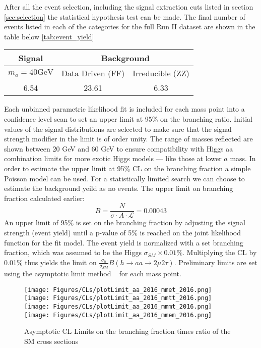 

After all the event selection, including the signal extraction cuts listed in section \ref{sec:selection} the statistical hypothesis test can be made. 
The final number of events listed in each of the categories for the full Run II dataset are shown in the table below \ref{tab:event_yield}


\begin{table}[h!tbp]
\centering
{}
\begin{tabular*}{0.8\textwidth}{c|c|c}
\hline
Signal & \multicolumn{2}{c}{Background} \\
\hline $m_a=40\text{GeV}$ & Data Driven (FF) & Irreducible (ZZ)\\\hline
6.54   & 23.61 & 6.33 \\\hline
\end{tabular*}
\end{table}
 



Each unbinned parametric likelihood fit is included for each mass point into a confidence level scan to set an upper limit at 95\% on the branching ratio. Initial values of the signal distributions are selected to make sure that the signal strength modifier in the limit is of order unity. The range of masses reflected are shown between 20 GeV and 60 GeV to ensure compatibility with Higgs aa combination limits for more exotic Higgs models --- like those at lower $a$ mass. 
In order to estimate the upper limit at 95\% CL on the branching fraction a simple Poisson model can be used. For a statistically limited search we can choose to estimate the background yeild as no events. The upper limit on branching fraction calculated earlier: 
\[B =  \frac{N}{\sigma \cdot A\cdot \mathcal{L}} = 0.00043\] 
An upper limit of 95\% is set on the branching fraction by adjusting the signal strength (event yield) until a p-value of 5\% is reached on the joint likelihood function for the fit model. 
The event yield is normalized with a set branching fraction, which was assumed to be the Higgs $\sigma_{SM} \times 0.01\%$.
Multiplying the CL by 0.01\% thus yields the limit on $\frac{\sigma_h}{\sigma_{SM}} B(h\rightarrow aa\rightarrow2\mu2\tau)$.
Preliminary limits are set using the asymptotic limit method ~\cite{Cowan_2011} for each mass point.


\begin{figure}[ht!b]
  \centering
  \texttt{[image: Figures/CLs/plotLimit\_aa\_2016\_mmet\_2016.png]}
  \texttt{[image: Figures/CLs/plotLimit\_aa\_2016\_mmtt\_2016.png]}\\
  \texttt{[image: Figures/CLs/plotLimit\_aa\_2016\_mmmt\_2016.png]}
  \texttt{[image: Figures/CLs/plotLimit\_aa\_2016\_mmem\_2016.png]}\\
    \caption{\label{fig:CLs2016} Asymptotic CL Limits on the branching fraction times ratio of the SM cross sections}
\end{figure}

